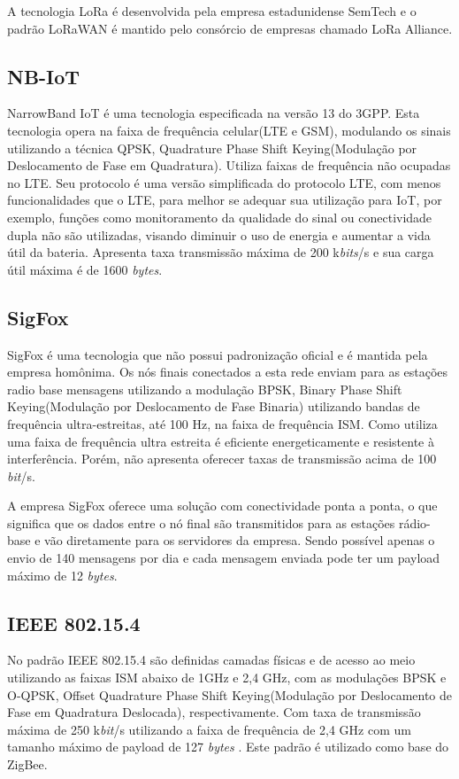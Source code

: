 A tecnologia LoRa é desenvolvida pela empresa estadunidense SemTech e o padrão LoRaWAN é mantido pelo consórcio de empresas chamado LoRa Alliance.

\subsection{NB-IoT}
NarrowBand IoT é uma tecnologia especificada na versão 13 do 3GPP. Esta tecnologia opera na faixa de frequência celular(LTE e GSM), modulando os sinais utilizando a técnica QPSK, Quadrature Phase Shift Keying(Modulação por Deslocamento de Fase em Quadratura). Utiliza faixas de frequência não ocupadas no LTE. Seu protocolo é uma versão simplificada do protocolo LTE, com menos funcionalidades que o LTE, para melhor se adequar sua utilização para IoT, por exemplo, funções como monitoramento da qualidade do sinal ou conectividade dupla não são utilizadas, visando diminuir o uso de energia e aumentar a vida útil da bateria. Apresenta taxa transmissão máxima de 200 k\emph{bits}/s e sua carga útil máxima é de 1600 \emph{bytes}.

\subsection{SigFox}
SigFox é uma tecnologia que não possui padronização oficial e é mantida pela empresa homônima. Os nós finais conectados a esta rede enviam para as estações radio base mensagens utilizando a modulação BPSK, Binary Phase Shift Keying(Modulação por Deslocamento de Fase Binaria) utilizando bandas de frequência ultra-estreitas, até 100 Hz, na faixa de frequência ISM. Como utiliza uma faixa de frequência ultra estreita é eficiente energeticamente e resistente à interferência. Porém, não apresenta oferecer taxas de transmissão acima de 100 \emph{bit}/s.

A empresa SigFox oferece uma solução com conectividade ponta a ponta, o que significa que os dados entre o nó final são transmitidos para as estações rádio-base e vão diretamente para os servidores da empresa. Sendo possível apenas o envio de 140 mensagens por dia e cada mensagem enviada pode ter um payload máximo de 12 \emph{bytes}.

\subsection{IEEE 802.15.4}
No padrão IEEE 802.15.4 são definidas camadas físicas e de acesso ao meio utilizando as faixas ISM abaixo de 1GHz e 2,4 GHz, com as modulações BPSK e O-QPSK, Offset Quadrature Phase Shift Keying(Modulação por Deslocamento de Fase em Quadratura Deslocada), respectivamente. Com taxa de transmissão máxima de 250 k\emph{bit}/s utilizando a faixa de frequência de 2,4 GHz com um tamanho máximo de payload de 127 \emph{bytes} \cite{munoz2018overview} \cite{gomes2017estimaccao}. Este padrão é utilizado como base do ZigBee.

